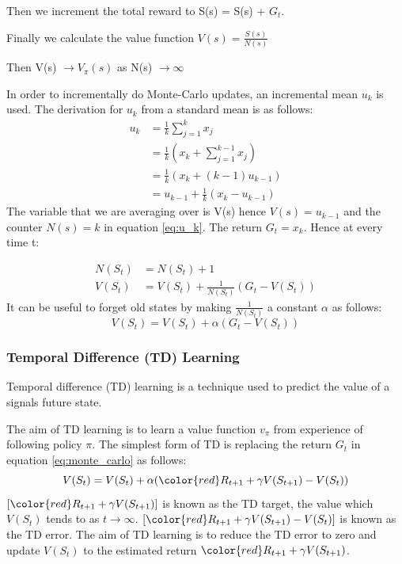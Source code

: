Then we increment the total reward to S(s) =  S(s) + $G_t$.

Finally we calculate the value function $V(s)=\frac{S(s)}{N(s)}$

Then V(s) $\to V_\pi(s)$ as N(s) $\to \infty$

In order to incrementally do Monte-Carlo updates, an incremental mean $u_k$ is used. The derivation for $u_k$ from a standard mean is as follows:
\begin{align}
	u_k &= \frac{1}{k}\sum_{j=1}^{k}x_j\\
	&= \frac{1}{k}(x_k + \sum_{j=1}^{k-1}x_j)\\
	&= \frac{1}{k}(x_k +(k-1)u_{k-1})\\
	&= u_{k-1} + \frac{1}{k}(x_k - u_{k-1})
	\label{eq:u_k}
\end{align}
The variable that we are averaging over is V(s) hence $V(s)=u_{k-1}$ and the counter $N(s)=k$ in equation \ref{eq:u_k}. The return $G_t =x_k$. Hence at every time t:

\begin{align}
	N(S_t) &= N(S_t) + 1 \\
	V(S_t) &= V(S_t) + \frac{1}{N(S_t)}(G_t - V(S_t))
\end{align}
It can be useful to forget old states by making $\frac{1}{N(S_t)}$ a constant $\alpha$ as follows:
\begin{equation}
	V(S_t) = V(S_t) + \alpha(G_t - V(S_t))
	\label{eq:monte_carlo}
\end{equation}


\subsubsection{Temporal Difference (TD) Learning}
Temporal difference (TD) learning is a technique used to predict the value of a signals future state.

The aim of TD learning is to learn a value function $v_\pi$ from experience of following policy $\pi$. 
The simplest form of TD is replacing the return $G_t$ in equation \ref{eq:monte_carlo} as follows:
\begin{equation}
	V(S_t) = V(S_t) + \alpha({\color{red}R_{t+1} +  \gamma V(S_{t+1})} - V(S_t))
	\label{eq:monte_carlo_TD}
\end{equation}
$[{\color{red}R_{t+1} +  \gamma V(S_{t+1})}]$ is known as the TD target, the value which $V(S_t)$ tends to as $t \to \infty$.
$[{\color{red}R_{t+1} +  \gamma V(S_{t+1})} - V(S_t)]$ is known as the TD error. The aim of TD learning is to reduce the TD error to zero and update $V(S_t)$ to the estimated return ${\color{red}R_{t+1} +  \gamma V(S_{t+1})}$.

